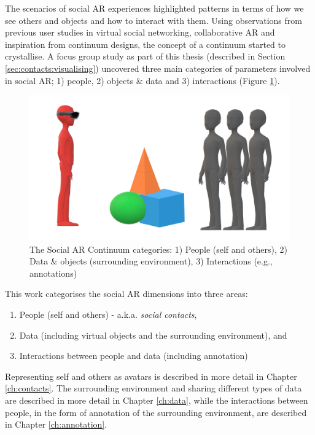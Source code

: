 The scenarios of social AR experiences highlighted patterns in terms of how we see others and objects and how to interact with them. Using observations from previous user studies in virtual social networking, collaborative AR and inspiration from continuum designs, the concept of a continuum started to crystallise. A focus group study as part of this thesis (described in Section \ref{sec:contacts:visualising}) uncovered three main categories of parameters involved in social AR; 1) people, 2) objects \& data and 3) interactions (Figure \ref{fig:continuum:categories}).

\begin{figure}[ht]
    \centering
    \includegraphics[width=0.8\linewidth]{images/30-continuum/continuum_categories5.png}
    \caption{The Social AR Continuum categories: 1) People (self and others), 2) Data \& objects (surrounding environment), 3) Interactions (e.g., annotations)}
    \label{fig:continuum:categories}
\end{figure}

This work categorises the social AR dimensions into three areas: 
\begin{enumerate}
    \item People (self and others) - a.k.a. \textit{social contacts},
    \item Data (including virtual objects and the surrounding environment), and
    \item Interactions between people and data (including annotation)
\end{enumerate}

Representing self and others as avatars is described in more detail in Chapter \ref{ch:contacts}. The surrounding environment and sharing different types of data are described in more detail in Chapter \ref{ch:data}, while the interactions between people, in the form of annotation of the surrounding environment, are described in Chapter \ref{ch:annotation}.


